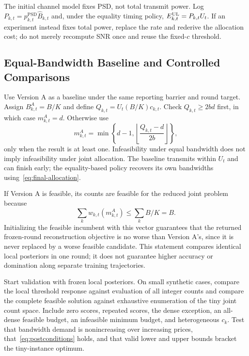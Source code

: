 The initial channel model fixes PSD, not total transmit power. Log $P_{k,t}=p_{k,t}^{\mathrm{PSD}}\widehat B_{k,t}$ and, under the equality timing policy, $E_{k,t}^{\mathrm{UL}}=P_{k,t}U_t$. If an experiment instead fixes total power, replace the rate and rederive the allocation cost; do not merely recompute SNR once and reuse the fixed-$c$ threshold.

\subsection{Equal-Bandwidth Baseline and Controlled Comparisons}
Use Version A as a baseline under the same reporting barrier and round target. Assign $B_{k,t}^{A}=B/K$ and define $Q_{k,t}=U_t(B/K)c_{k,t}$. Check $Q_{k,t}\ge2bd$ first, in which case $m_{k,t}^{A}=d$. Otherwise use
\begin{equation}
 m_{k,t}^{A}
 =\min\left\{d-1,
 \left\lfloor\frac{Q_{k,t}-d}{2b}\right\rfloor\right\},
 \label{eq:version-a}
\end{equation}
only when the result is at least one. Infeasibility under equal bandwidth does not imply infeasibility under joint allocation. The baseline transmits within $U_t$ and can finish early; the equality-based policy recovers its own bandwidths using~\eqref{eq:final-allocation}.

If Version A is feasible, its counts are feasible for the reduced joint problem because
\begin{equation}
 \sum_kw_{k,t}(m_{k,t}^{A})\le\sum_k B/K=B.
 \label{eq:baseline-incumbent}
\end{equation}
Initializing the feasible incumbent with this vector guarantees that the returned frozen-round reconstruction objective is no worse than Version A's, since it is never replaced by a worse feasible candidate. This statement compares identical local posteriors in one round; it does not guarantee higher accuracy or domination along separate training trajectories.

Start validation with frozen local posteriors. On small synthetic cases, compare the local threshold response against evaluation of all integer counts and compare the complete feasible solution against exhaustive enumeration of the tiny joint count space. Include zero scores, repeated scores, the dense exception, an all-dense feasible budget, an infeasible minimum budget, and heterogeneous $c_k$. Test that bandwidth demand is nonincreasing over increasing prices, that~\eqref{eq:postconditions} holds, and that valid lower and upper bounds bracket the tiny-instance optimum.


